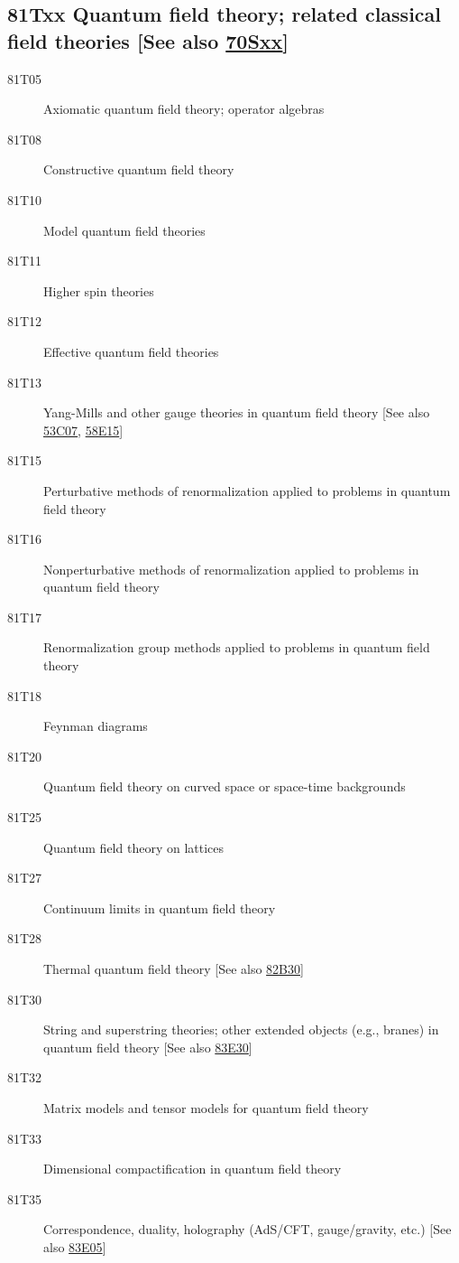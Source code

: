 \documentclass[letterpaper]{article}
\begin{document}
\subsection*{81Txx  Quantum field theory; related classical field theories [See also \hyperref[70Sxx]{70Sxx}] }\label{81Txx}
\begin{description}  
\item [81T05]\label{81T05} Axiomatic quantum field theory; operator algebras
\item [81T08]\label{81T08} Constructive quantum field theory
\item [81T10]\label{81T10} Model quantum field theories
\item [81T11]\label{81T11} Higher spin theories
\item [81T12]\label{81T12} Effective quantum field theories
\item [81T13]\label{81T13} Yang-Mills and other gauge theories in quantum field theory [See also \hyperref[53C07]{53C07}, \hyperref[58E15]{58E15}]
\item [81T15]\label{81T15} Perturbative methods of renormalization applied to problems in quantum field theory 
\item [81T16]\label{81T16} Nonperturbative methods of renormalization applied to problems in quantum field theory
\item [81T17]\label{81T17} Renormalization group methods applied to problems in quantum field theory
\item [81T18]\label{81T18} Feynman diagrams
\item [81T20]\label{81T20} Quantum field theory on curved space or space-time backgrounds
\item [81T25]\label{81T25} Quantum field theory on lattices
\item [81T27]\label{81T27} Continuum limits in quantum field theory
\item [81T28]\label{81T28} Thermal quantum field theory [See also \hyperref[82B30]{82B30}]
\item [81T30]\label{81T30} String and superstring theories; other extended objects (e.g., branes) in quantum field theory [See also \hyperref[83E30]{83E30}]
\item [81T32]\label{81T32} Matrix models and tensor models for quantum field theory
\item [81T33]\label{81T33} Dimensional compactification in quantum field theory
\item [81T35]\label{81T35} Correspondence, duality, holography (AdS/CFT, gauge/gravity, etc.) [See also \hyperref[83E05]{83E05}]

\end{description}
\end{document}
